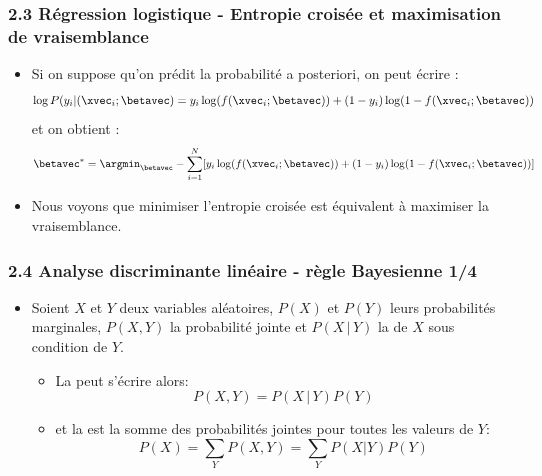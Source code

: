\begin{frame}
  \frametitle{2.3 Régression logistique - Entropie croisée et maximisation de vraisemblance}
  \begin{itemize}
    \item Si on suppose qu'on prédit la probabilité a posteriori, on peut écrire : 
    \begin{equation*}
    \log P(y_i|(\xvec_i; \betavec) = y_i \log (f(\xvec_i; \betavec)) + (1-y_i)\log (1-f(\xvec_i; \betavec))
    \end{equation*}
    et on obtient : 
    \begin{equation*}
    \betavec^{\ast} = \argmin_{\betavec} - \sum_{i=1}^N [y_i \log (f(\xvec_i; \betavec)) + (1-y_i)\log (1-f(\xvec_i; \betavec))]
    \end{equation*}
    \item Nous voyons que minimiser l'entropie croisée est équivalent à maximiser la vraisemblance.
  \end{itemize}
\end{frame}



\begin{frame}
\frametitle{2.4 Analyse discriminante linéaire - règle Bayesienne 1/4}
  \begin{itemize}
  \item Soient $X$ et $Y$ deux variables aléatoires, $P(X)$ et $P(Y)$ leurs probabilités marginales, $P(X,Y)$ la probabilité jointe et $P(X\,|\,Y)$ la  de $X$ sous condition de $Y$.
    \begin{itemize}
    \item La  peut s'écrire alors:
    \begin{equation}
      P(X,Y) = P(X\,|\,Y)P(Y)
    \end{equation}
    \item et la  est la somme des probabilités jointes pour toutes les valeurs de $Y$:
    \begin{equation}
      P(X) = \sum_Y P(X,Y) = \sum_Y P(X|Y)P(Y)
    \end{equation}
  \end{itemize}
  \end{itemize}
\end{frame}

